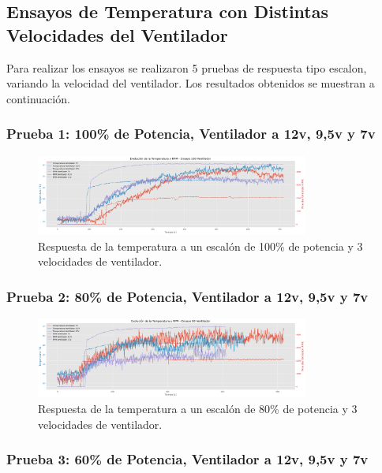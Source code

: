 \documentclass[spanish, a4paper, 11pt]{article}
\begin{document}
\FloatBarrier


\subsection{Ensayos de Temperatura con Distintas Velocidades del Ventilador}

Para realizar los ensayos se realizaron 5 pruebas de respuesta tipo escalon, variando la velocidad del ventilador. Los resultados obtenidos se muestran a continuación.

\subsubsection{Prueba 1: 100\% de Potencia, Ventilador a 12v, 9,5v y 7v}

\begin{figure}[ht]
    \centering
    \includegraphics[width=0.8\textwidth]{./figures/ventilador_100.png}
    \caption{Respuesta de la temperatura a un escalón de 100\% de potencia y 3 velocidades de ventilador.}
\end{figure}
\FloatBarrier

\subsubsection{Prueba 2: 80\% de Potencia, Ventilador a 12v, 9,5v y 7v}

\begin{figure}[ht]
    \centering
    \includegraphics[width=0.8\textwidth]{./figures/ventilador_80.png}
    \caption{Respuesta de la temperatura a un escalón de 80\% de potencia y 3 velocidades de ventilador.}
\end{figure}
\FloatBarrier

\subsubsection{Prueba 3: 60\% de Potencia, Ventilador a 12v, 9,5v y 7v}
\end{document}
